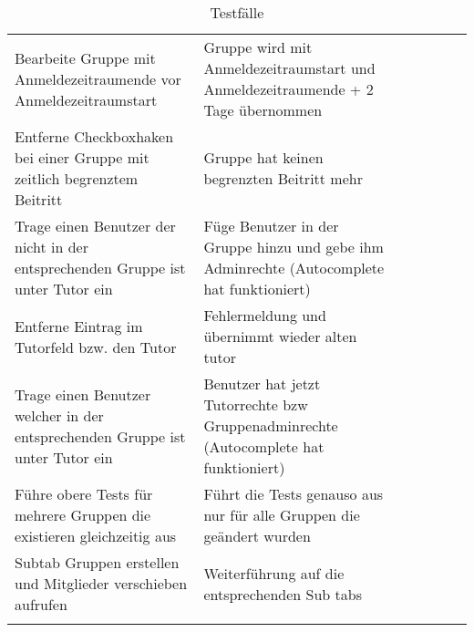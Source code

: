 \begin{table}[]
	\centering
	\caption{Testfälle}
	\label{my-label}
	\begin{tabular}{p{6cm}p{7cm}p{3cm}llll}
		Bearbeite Gruppe mit Anmeldezeitraumende vor Anmeldezeitraumstart                                                                    & Gruppe wird mit Anmeldezeitraumstart und Anmeldezeitraumende + 2 Tage übernommen                                                                                 & \checkmark            &  &  &  \\
		
		Entferne Checkboxhaken bei einer Gruppe mit zeitlich begrenztem Beitritt                                                             & Gruppe hat keinen begrenzten Beitritt mehr                                                                                                                       & \checkmark           &  &  &  \\
		Trage einen Benutzer der nicht in der entsprechenden Gruppe ist unter Tutor ein                                                      & Füge Benutzer in der Gruppe hinzu und gebe ihm Adminrechte (Autocomplete hat funktioniert)                                                                       & \checkmark           &  &  &  \\
		Entferne Eintrag im Tutorfeld bzw. den Tutor                                                                                         & Fehlermeldung und übernimmt wieder alten tutor                                                                                                                   &             &  &  &  \\
		Trage einen Benutzer welcher in der entsprechenden Gruppe ist unter Tutor ein                                                        & Benutzer hat jetzt Tutorrechte bzw Gruppenadminrechte (Autocomplete hat funktioniert)                                                                            & \checkmark           &  &  &  \\
		Führe obere Tests für mehrere Gruppen die existieren gleichzeitig aus                                                                & Führt die Tests genauso aus nur für alle Gruppen die geändert wurden                                                                                             & \checkmark           &  &  &  \\

		Subtab Gruppen erstellen und Mitglieder verschieben aufrufen                                                                         & Weiterführung auf die entsprechenden Sub tabs                                                                                                                    & \checkmark           &  &  &  \\&                                                                                                                                                                  &             &  &  &  \\
	

\end{tabular}
\end{table}

